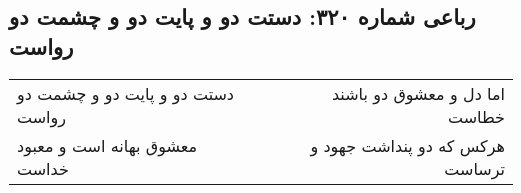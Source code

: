 \begin{center}
\section*{رباعی شماره ۳۲۰: دستت دو و پایت دو و چشمت دو رواست}
\label{sec:0320}
\begin{longtable}{l p{0.5cm} r}
دستت دو و پایت دو و چشمت دو رواست
&&
اما دل و معشوق دو باشند خطاست
\\
معشوق بهانه است و معبود خداست
&&
هرکس که دو پنداشت جهود و ترساست
\\
\end{longtable}
\end{center}
